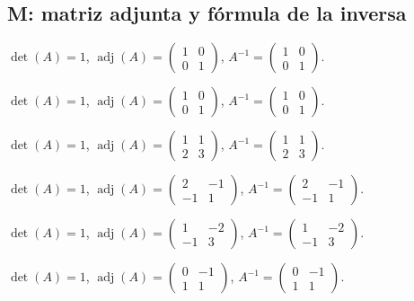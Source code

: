 \documentclass[12pt]{article}
\theoremstyle{remark}
\newcommand{\adj}{\operatorname{adj}}
\begin{document}
\subsection*{M: matriz adjunta y fórmula de la inversa}
\begin{description}[style=nextline,leftmargin=3em,itemsep=0.45em]
\item[E187.] $\det(A)=1$, $\adj(A)=\begin{pmatrix}1&0\\0&1\end{pmatrix}$, $A^{-1}=\begin{pmatrix}1&0\\0&1\end{pmatrix}$.
\item[E188.] $\det(A)=1$, $\adj(A)=\begin{pmatrix}1&0\\0&1\end{pmatrix}$, $A^{-1}=\begin{pmatrix}1&0\\0&1\end{pmatrix}$.
\item[E189.] $\det(A)=1$, $\adj(A)=\begin{pmatrix}1&1\\2&3\end{pmatrix}$, $A^{-1}=\begin{pmatrix}1&1\\2&3\end{pmatrix}$.
\item[E190.] $\det(A)=1$, $\adj(A)=\begin{pmatrix}2&-1\\-1&1\end{pmatrix}$, $A^{-1}=\begin{pmatrix}2&-1\\-1&1\end{pmatrix}$.
\item[E191.] $\det(A)=1$, $\adj(A)=\begin{pmatrix}1&-2\\-1&3\end{pmatrix}$, $A^{-1}=\begin{pmatrix}1&-2\\-1&3\end{pmatrix}$.
\item[E192.] $\det(A)=1$, $\adj(A)=\begin{pmatrix}0&-1\\1&1\end{pmatrix}$, $A^{-1}=\begin{pmatrix}0&-1\\1&1\end{pmatrix}$.

\end{description}
\end{document}
